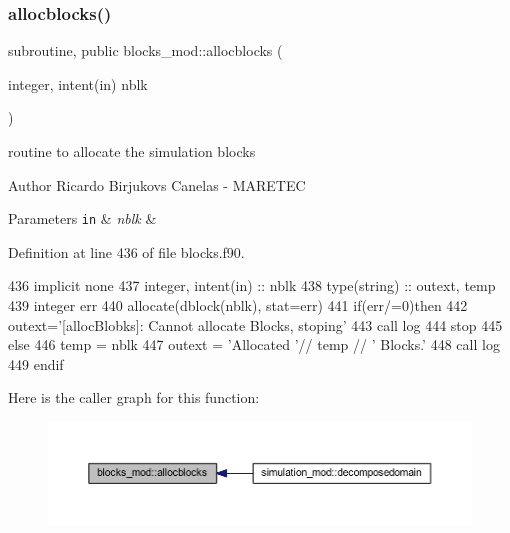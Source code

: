 \subsubsection{\texorpdfstring{allocblocks()}{allocblocks()}}
{\footnotesize\ttfamily subroutine, public blocks\+\_\+mod\+::allocblocks (\begin{DoxyParamCaption}\item[{integer, intent(in)}]{nblk }\end{DoxyParamCaption})}



routine to allocate the simulation blocks 

\begin{DoxyAuthor}{Author}
Ricardo Birjukovs Canelas -\/ M\+A\+R\+E\+T\+EC 
\end{DoxyAuthor}

\begin{DoxyParams}[1]{Parameters}
\mbox{\tt in}  & {\em nblk} & \\
\hline
\end{DoxyParams}


Definition at line 436 of file blocks.\+f90.


\begin{DoxyCode}
436     \textcolor{keywordtype}{implicit none}
437     \textcolor{keywordtype}{integer}, \textcolor{keywordtype}{intent(in)} ::  nblk
438     \textcolor{keywordtype}{type}(string) :: outext, temp
439     \textcolor{keywordtype}{integer} err
440     \textcolor{keyword}{allocate}(dblock(nblk), stat=err)
441     \textcolor{keywordflow}{if}(err/=0)\textcolor{keywordflow}{then}
442         outext=\textcolor{stringliteral}{'[allocBlobks]: Cannot allocate Blocks, stoping'}
443         \textcolor{keyword}{call }log%
444         stop
445     \textcolor{keywordflow}{else}
446         temp = nblk
447         outext = \textcolor{stringliteral}{'Allocated '}// temp // \textcolor{stringliteral}{' Blocks.'}
448         \textcolor{keyword}{call }log%
449 \textcolor{keywordflow}{    endif}
\end{DoxyCode}
Here is the caller graph for this function\+:
\nopagebreak
\begin{figure}[H]
\begin{center}
\leavevmode
\includegraphics[width=350pt]{namespaceblocks__mod_a639beb0fee2290d46353f4b4702d6711_icgraph}
\end{center}
\end{figure}
\mbox{\label{namespaceblocks__mod_a27c7e788c5f3979bfe9d43aad138286a}} 
